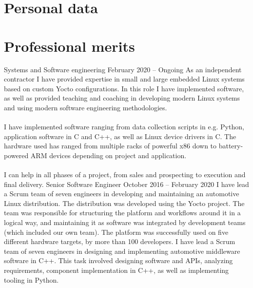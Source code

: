 \documentclass{twocolcv}
\begin{document}
\section*{Personal data}
\section*{Professional merits}
           {Systems and Software engineering}
           {February 2020 -- Ongoing}
           {
        {As an independent contractor I have provided expertise in small and large embedded Linux systems based on custom Yocto configurations. In this role I have implemented software, as well as provided teaching and coaching in developing modern Linux systems and using modern software engineering methodologies.
\\\\
I have implemented software ranging from data collection scripts in e.g. Python, application software in C and C++, as well as Linux device drivers in C. The hardware used has ranged from multiple racks of powerful x86 down to battery-powered ARM devices depending on project and application.
\\\\
I can help in all phases of a project, from sales and prospecting to execution and final delivery.}
}
           {Senior Software Engineer}
           {October 2016 -- February 2020}
           {
        {I have lead a Scrum team of seven engineers in developing and maintaining an automotive Linux distribution. The distribution was developed using the Yocto project. The team was responsible for structuring the platform and workflows around it in a logical way, and maintaining it as software was integrated by development teams (which included our own team). The platform was successfully used on five different hardware targets, by more than 100 developers.}
\newline\newline
{}
        {I have lead a Scrum team of seven engineers in designing and implementing automotive middleware software in C++. This task involved designing software and APIs, analyzing requirements, component implementation in C++, as well as implementing tooling in Python.
}
}
\end{document}

